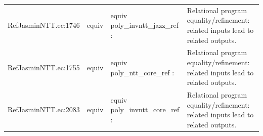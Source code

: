 \documentclass[10pt]{article}
\begin{document}
\begin{longtable}{L{0.11\textwidth}L{0.05\textwidth}L{0.38\textwidth}L{0.42\textwidth}}
RefJasminNTT.\allowbreak{}ec:\allowbreak{}1746 & equiv & {\ttfamily\scriptsize equiv poly\_invntt\_jazz\_ref :} & Relational program equality/refinement: related inputs lead to related outputs. \\
RefJasminNTT.\allowbreak{}ec:\allowbreak{}1755 & equiv & {\ttfamily\scriptsize equiv poly\_ntt\_core\_ref :} & Relational program equality/refinement: related inputs lead to related outputs. \\
RefJasminNTT.\allowbreak{}ec:\allowbreak{}2083 & equiv & {\ttfamily\scriptsize equiv poly\_invntt\_core\_ref :} & Relational program equality/refinement: related inputs lead to related outputs. \\
\bottomrule
\end{longtable}
\end{document}
